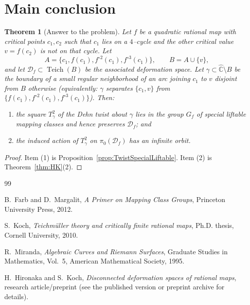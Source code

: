 \documentclass[11pt]{article}
\newtheorem{theorem}{Theorem}[section]
\DeclareMathOperator{\Teich}{Teich}
\begin{document}
\section{Main conclusion}

\begin{theorem}[Answer to the problem]\label{thm:main}
Let $f$ be a quadratic rational map with critical points $c_1,c_2$ such that $c_1$ lies on a $4$--cycle and the other critical value $v=f(c_2)$ is not on that cycle. Let
\[
A=\{c_1,f(c_1),f^{\circ 2}(c_1),f^{\circ 3}(c_1)\},\qquad B=A\cup\{v\},
\]
and let $\mathcal D_f\subset \Teich(B)$ be the associated deformation space. Let $\gamma\subset \widehat{\mathbb C}\setminus B$ be the boundary of a small regular neighborhood of an arc joining $c_1$ to $v$ disjoint from $B$ otherwise (equivalently: $\gamma$ separates $\{c_1,v\}$ from $\{f(c_1),f^{\circ 2}(c_1),f^{\circ 3}(c_1)\}$). Then:
\begin{enumerate}
\item the square $T_\gamma^2$ of the Dehn twist about $\gamma$ lies in the group $G_f$ of special liftable mapping classes and hence preserves $\mathcal D_f$; and
\item the induced action of $T_\gamma^2$ on $\pi_0(\mathcal D_f)$ has an infinite orbit.
\end{enumerate}
\end{theorem}

\begin{proof}
Item (1) is Proposition~\ref{prop:TwistSpecialLiftable}. Item (2) is Theorem~\ref{thm:HK}(2).
\end{proof}

\begin{thebibliography}{99}

B.~Farb and D.~Margalit,
\newblock \emph{A Primer on Mapping Class Groups},
\newblock Princeton University Press, 2012.

S.~Koch,
\newblock \emph{Teichm\"uller theory and critically finite rational maps},
\newblock Ph.D. thesis, Cornell University, 2010.

R.~Miranda,
\newblock \emph{Algebraic Curves and Riemann Surfaces},
\newblock Graduate Studies in Mathematics, Vol.~5, American Mathematical Society, 1995.

H.~Hironaka and S.~Koch,
\newblock \emph{Disconnected deformation spaces of rational maps},
\newblock research article/preprint (see the published version or preprint archive for details).

\end{thebibliography}
\end{document}
